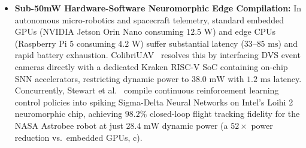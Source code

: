 \begin{itemize}
    \item \textbf{Sub-50mW Hardware-Software Neuromorphic Edge Compilation:} In autonomous micro-robotics and spacecraft telemetry, standard embedded GPUs (NVIDIA Jetson Orin Nano consuming $12.5\text{ W}$) and edge CPUs (Raspberry Pi 5 consuming $4.2\text{ W}$) suffer substantial latency ($33$--$85\text{ ms}$) and rapid battery exhaustion. ColibriUAV~\cite{Renner2023Colibri} resolves this by interfacing DVS event cameras directly with a dedicated Kraken RISC-V SoC containing on-chip SNN accelerators, restricting dynamic power to $38.0\text{ mW}$ with $1.2\text{ ms}$ latency. Concurrently, Stewart et al.~\cite{Stewart2025Astrobee} compile continuous reinforcement learning control policies into spiking Sigma-Delta Neural Networks on Intel's Loihi 2 neuromorphic chip, achieving $98.2\%$ closed-loop flight tracking fidelity for the NASA Astrobee robot at just $28.4\text{ mW}$ dynamic power (a $52\times$ power reduction vs.\ embedded GPUs, c).
\end{itemize}

